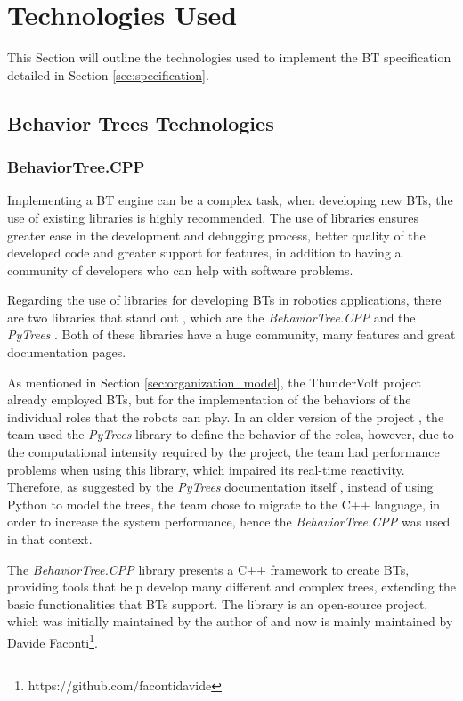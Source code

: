 \section{Technologies Used}
\label{sec:technologies_used}

This Section will outline the technologies used to implement the BT specification detailed in Section \ref{sec:specification}.

\subsection{Behavior Trees Technologies}

\subsubsection{BehaviorTree.CPP}

Implementing a BT engine can be a complex task, when developing new BTs, the use of existing libraries is highly recommended. The use of libraries ensures greater ease in the development and debugging process, better quality of the developed code and greater support for features, in addition to having a community of developers who can help with software problems.

Regarding the use of libraries for developing BTs in robotics applications, there are two libraries that stand out \cite{BTsAndFSMApplications}, which are the \textit{BehaviorTree.CPP} \cite{BehaviorTree.CPP} and the \textit{PyTrees} \cite{PyTrees}. Both of these libraries have a huge community, many features and great documentation pages. 

As mentioned in Section \ref{sec:organization_model}, the ThunderVolt project already employed BTs, but for the implementation of the behaviors of the individual roles that the robots can play. In an older version of the project \cite{fira_thundervolt}, the team used the \textit{PyTrees} library to define the behavior of the roles, however, due to the computational intensity required by the project, the team had performance problems when using this library, which impaired its real-time reactivity. Therefore, as suggested by the \textit{PyTrees} documentation itself \cite{PyTreesDesign}, instead of using Python to model the trees, the team chose to migrate to the C++ language, in order to increase the system performance, hence the \textit{BehaviorTree.CPP} was used in that context.

The \textit{BehaviorTree.CPP} library presents a C++ framework to create BTs, providing tools that help develop many different and complex trees, extending the basic functionalities that BTs support. The library is an open-source project, which was initially maintained by the author of \cite{BTsInRobotics} and now is mainly maintained by Davide Faconti\footnote{https://github.com/facontidavide}.

